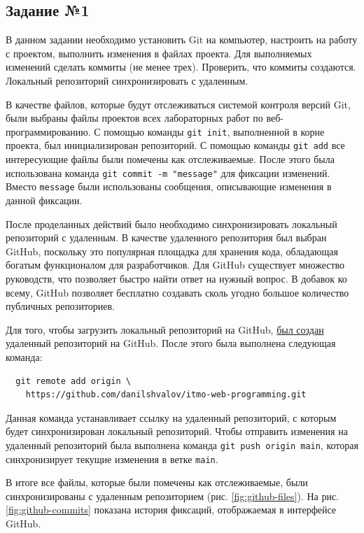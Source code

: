 \documentclass[a4paper, 14pt]{extarticle}
\begin{document}
\subsection*{Задание №1}

В данном задании необходимо установить Git на компьютер, настроить на работу с
проектом, выполнить изменения в файлах проекта. Для выполняемых изменений
сделать коммиты (не менее трех). Проверить, что коммиты создаются. Локальный
репозиторий синхронизировать с удаленным.

В качестве файлов, которые будут отслеживаться системой контроля версий Git,
были выбраны файлы проектов всех лабораторных работ по веб-программированию. С
помощью команды \texttt{git init}, выполненной в корне проекта, был
инициализирован репозиторий. С помощью команды \texttt{git add} все интересующие
файлы были помечены как отслеживаемые. После этого была использована команда
\texttt{git commit -m "message"} для фиксации изменений. Вместо \texttt{message}
были использованы сообщения, описывающие изменения в данной фиксации.

После проделанных действий было необходимо синхронизировать локальный
репозиторий с удаленным. В качестве удаленного репозитория был выбран GitHub,
поскольку это популярная площадка для хранения кода, обладающая богатым
функционалом для разработчиков. Для GitHub существует множество руководств, что
позволяет быстро найти ответ на нужный вопрос. В добавок ко всему, GitHub
позволяет бесплатно создавать сколь угодно большое количество публичных
репозиториев.

Для того, чтобы загрузить локальный репозиторий на GitHub,
\href{https://github.com/danilshvalov/itmo-web-programming}{был создан}
удаленный репозиторий на GitHub. После этого была выполнена следующая команда:
\begin{verbatim}
  git remote add origin \
    https://github.com/danilshvalov/itmo-web-programming.git
\end{verbatim}
Данная команда устанавливает ссылку на удаленный репозиторий, с которым будет
синхронизирован локальный репозиторий. Чтобы отправить изменения на удаленный
репозиторий была выполнена команда \texttt{git push origin main}, которая
синхронизирует текущие изменения в ветке \texttt{main}.

В итоге все файлы, которые были помечены как отслеживаемые, были
синхронизированы с удаленным репозиторием (рис. \ref{fig:github-files}). На рис.
\ref{fig:github-commits} показана история фиксаций, отображаемая в интерфейсе
GitHub.
\end{document}

